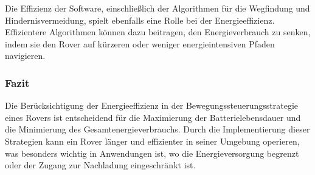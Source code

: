 \documentclass{vorlage-design-main}
\begin{document}
Die Effizienz der Software, einschließlich der Algorithmen für die
Wegfindung und Hindernisvermeidung, spielt ebenfalls eine Rolle bei der
Energieeffizienz. Effizientere Algorithmen können dazu beitragen, den
Energieverbrauch zu senken, indem sie den Rover auf kürzeren oder
weniger energieintensiven Pfaden navigieren.

\hypertarget{fazit}{%
\subsubsection{Fazit}\label{fazit}}

Die Berücksichtigung der Energieeffizienz in der
Bewegungssteuerungsstrategie eines Rovers ist entscheidend für die
Maximierung der Batterielebensdauer und die Minimierung des
Gesamtenergieverbrauchs. Durch die Implementierung dieser Strategien
kann ein Rover länger und effizienter in seiner Umgebung operieren, was
besonders wichtig in Anwendungen ist, wo die Energieversorgung begrenzt
oder der Zugang zur Nachladung eingeschränkt ist. %


\clearpage
\printbibliography
\end{document}
